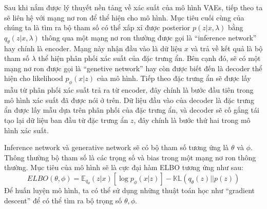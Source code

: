         
        Sau khi nắm được lý thuyết nền tảng về xác suất của mô hình VAEs, tiếp theo ta sẽ liên hệ với mạng nơ ron để thể hiện cho mô hình.
        Mục tiêu cuối cùng của chúng ta là tìm ra bộ tham số có thể xấp xỉ được posterior $ p(z|x,\lambda)$ bằng $q_\theta(z|x,\lambda) $ thông qua một mạng nơ ron thường được gọi là  ``inference network'' hay chính là encoder. Mạng này nhận đầu vào là dữ liệu $x$ và trả về kết quả là bộ tham số $\lambda$ thể hiện phân phối xác suất của đặc trưng ẩn. 
        Bên cạnh đó, sẽ có một mạng nơ ron được gọi là ``genetive network'' hay còn được biết đến là decoder thể hiện cho likelihood $p_{\phi}(x|z)$ của mô hình. 
        Tiếp theo đặc trưng ẩn sẽ được lấy mẫu từ phân phối xác suất trả ra từ encoder, đây chính là bước đầu tiên trong mô hình xác suất đã được nói ở  trên.
        Dữ liệu đầu vào của decoder là đặc trưng ẩn được lấy mẫu dựa trên phân phối của đặc trưng ẩn, và decoder sẽ cố gắng tái tạo lại dữ liệu ban đầu từ đặc trưng ẩn $z$, đây chính là bước thứ hai trong mô hình xác suất.
        
        Inference network và generative network sẽ có bộ tham số tương ứng là $\theta$ và $\phi$.
        Thông thường bộ tham số là các trọng số và bias trong một mạng nơ ron thông thường. 
        Mục tiêu của mô hình sẽ là cực đại hàm ELBO tương ứng như sau:
        \begin{equation}
        \label{ELBO2}
            ELBO(\theta,\phi) = \mathbb{E}_{q_\theta}(z|x)[\log p_\phi(x|z)] - \mathbb{KL}(q_\theta(z)||p(z))
        \end{equation}
        Để huấn luyện mô hình, ta có thể sử dụng những thuật toán học như ``gradient descent'' để có thể tìm ra bộ trọng số $\theta,\phi$.